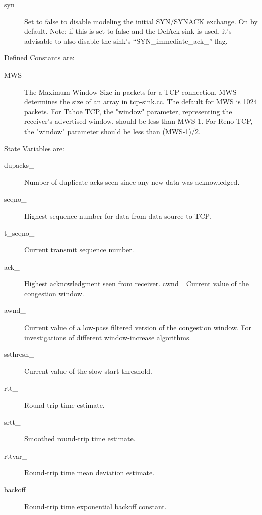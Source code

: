 \begin{description}
\begin{description}
\item[syn\_]
Set to false to disable modeling the initial SYN/SYNACK exchange. On by default.
Note: if this is set to false and the DelAck sink is used, it's advisable to also disable the sink's ``SYN\_immediate\_ack\_'' flag.
\end{description}

Defined Constants are:
\begin{description}
\item[MWS] The Maximum Window Size in packets for a TCP connection. MWS
determines the size of an array in tcp-sink.cc. The default for MWS is
1024 packets. For Tahoe TCP, the "window" parameter, representing the
receiver's advertised window, should be less than MWS-1. For Reno TCP, the
"window" parameter should be less than (MWS-1)/2. 
\end{description}

State Variables are:
\begin{description}

\item[dupacks\_]
Number of duplicate acks seen since any new data was acknowledged. 

\item[seqno\_]
Highest sequence number for data from data source to TCP. 

\item[t\_seqno\_]
Current transmit sequence number. 

\item[ack\_] Highest acknowledgment seen from receiver. cwnd\_
Current value of the congestion window. 

\item[awnd\_]
Current value of a low-pass filtered version of the congestion window. For
investigations of different window-increase algorithms. 

\item[ssthresh\_]
Current value of the slow-start threshold. 

\item[rtt\_] Round-trip time estimate. 

\item[srtt\_]
Smoothed round-trip time estimate. 

\item[rttvar\_]
Round-trip time mean deviation estimate. 

\item[backoff\_]
Round-trip time exponential backoff constant. 
\end{description}


\end{description}
